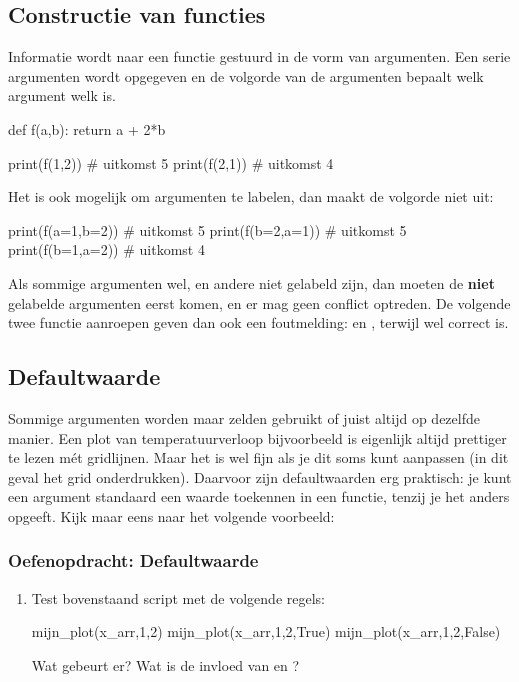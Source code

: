 \documentclass[a4paper,11pt, fleqn]{article}
\begin{document}
\subsection{Constructie van functies}
Informatie wordt naar een functie gestuurd in de vorm van argumenten. Een serie argumenten wordt opgegeven en de volgorde van de argumenten bepaalt welk argument welk is.
\begin{python}
def f(a,b):
    return a + 2*b
    
print(f(1,2)) # uitkomst 5
print(f(2,1)) # uitkomst 4
\end{python}

Het is ook mogelijk om argumenten te labelen, dan maakt de volgorde niet uit:
\begin{python}  
print(f(a=1,b=2)) # uitkomst 5
print(f(b=2,a=1)) # uitkomst 5
print(f(b=1,a=2)) # uitkomst 4
\end{python}
Als sommige argumenten wel, en andere niet gelabeld zijn, dan moeten de {\bf niet} gelabelde argumenten eerst komen, en er mag geen conflict optreden. De volgende twee functie aanroepen geven dan ook een foutmelding:  en , terwijl  wel correct is.

\subsection{Defaultwaarde}
Sommige argumenten worden maar zelden gebruikt of juist altijd op dezelfde manier. Een plot van temperatuurverloop bijvoorbeeld is eigenlijk altijd prettiger te lezen m\'et gridlijnen. Maar het is wel fijn als je dit soms kunt aanpassen (in dit geval het grid onderdrukken). Daarvoor zijn defaultwaarden erg praktisch: je kunt een argument standaard een waarde toekennen in een functie, tenzij je het anders opgeeft. Kijk maar eens naar het volgende voorbeeld:


\subsubsection*{Oefenopdracht: Defaultwaarde}
\begin{enumerate}
	\item Test bovenstaand script met de volgende regels:
	\begin{python}
mijn_plot(x_arr,1,2)
mijn_plot(x_arr,1,2,True)
mijn_plot(x_arr,1,2,False)
	\end{python}
	Wat gebeurt er? Wat is de invloed van  en ?
\end{enumerate}
\end{document}
